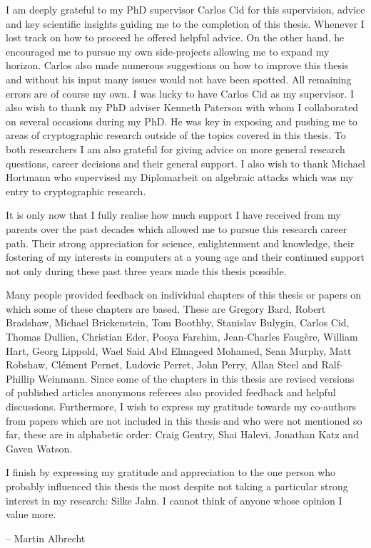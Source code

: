 I am deeply grateful to my PhD supervisor Carlos Cid for this supervision, advice and key scientific insights guiding me to the completion of this thesis. Whenever I lost track on how to proceed he offered helpful advice. On the other hand, he encouraged me to pursue my own side-projects allowing me to expand my horizon. Carlos also made numerous suggestions on how to improve this thesis and without his input many issues would not have been spotted. All remaining errors are of course my own. I was lucky to have Carlos Cid as my supervisor. I also wish to thank my PhD adviser Kenneth Paterson with whom I collaborated on several occasions during my PhD. He was key in exposing and pushing me to areas of cryptographic research outside of the topics covered in this thesis. To both researchers I am also grateful for giving advice on more general research questions, career decisions and their general support. I also wish to thank Michael Hortmann who supervised my Diplomarbeit on algebraic attacks which was my entry to cryptographic research.

It is only now that I fully realise how much support I have received from my parents over the past decades which allowed me to pursue this research career path. Their strong appreciation for science, enlightenment and knowledge, their fostering of my interests in computers at a young age and their continued support not only during these past three years made this thesis possible.

Many people provided feedback on individual chapters of this thesis or papers on which some of these chapters are based. These are Gregory Bard, Robert Bradshaw, Michael Brickenstein, Tom Boothby, Stanislav Bulygin, Carlos Cid, Thomas Dullien, Christian Eder, Pooya Farshim, Jean-Charles Faugère, William Hart, Georg Lippold, Wael Said Abd Elmageed Mohamed, Sean Murphy, Matt Robshaw, Cl{\'e}ment Pernet, Ludovic Perret, John Perry, Allan Steel and Ralf-Phillip Weinmann. Since some of the chapters in this thesis are revised versions of published articles anonymous referees also provided feedback and helpful discussions. Furthermore, I wish to express my gratitude towards my co-authors from papers which are not included in this thesis and who were not mentioned so far, these are in alphabetic order: Craig Gentry, Shai Halevi, Jonathan Katz and Gaven Watson.

I finish by expressing my gratitude and appreciation to the one person who probably influenced this thesis the most despite not taking a particular strong interest in my research: Silke Jahn. I cannot think of anyone whose opinion I value more.

\begin{flushright}
-- Martin Albrecht
\end{flushright}
